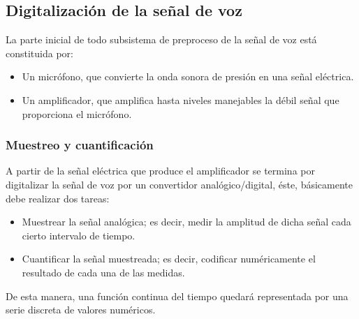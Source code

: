 
\subsection{Digitalización de la señal de voz}

La parte inicial de todo subsistema de preproceso de la señal de voz está constituida por:
\begin{itemize}
\item	Un micrófono, que convierte la onda sonora de presión en una señal eléctrica.
\item	Un amplificador, que amplifica hasta niveles manejables la débil señal que proporciona el micrófono.
\end{itemize}


\subsubsection{Muestreo y cuantificación}

A partir de la señal eléctrica que produce el amplificador se termina por digitalizar la señal de voz por un convertidor analógico/digital, éste, básicamente debe realizar dos tareas:

\begin{itemize}
\item	Muestrear la señal analógica; es decir, medir la amplitud de dicha señal cada cierto intervalo de tiempo.
\item	Cuantificar la señal muestreada; es decir, codificar numéricamente el resultado de cada una de las medidas.
\end{itemize}
De esta manera, una función continua del tiempo quedará representada por una serie discreta de valores numéricos.

